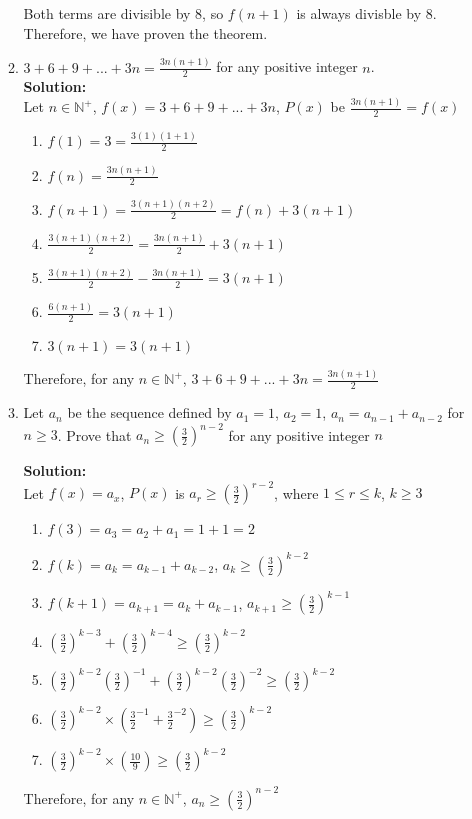\documentclass[12pt]{article}
\begin{document}
\begin{enumerate}
\begin{enumerate}
		Both terms are divisible by 8, so $f(n+1)$ is always divisble by 8. Therefore, we have proven the theorem.

		\newpage
		\item
		$3 + 6 + 9 +...+ 3n = \frac{3n(n+1)}{2}$ for any positive integer $n$.\\
		{\bf Solution:}\\

		Let $n \in \mathbb{N}^+$, $f(x) = 3 + 6 + 9 + ... + 3n$, $P(x)$ be $\frac{3n(n+1)}{2} = f(x)$
		\begin{enumerate}
			\item $f(1) = 3 = \frac{3(1)(1+1)}{2}$
			\item $f(n) = \frac{3n(n+1)}{2}$
			\item $f(n+1) = \frac{3(n+1)(n+2)}{2} = f(n) + 3(n+1)$
			\item $\frac{3(n+1)(n+2)}{2} = \frac{3n(n+1)}{2} + 3(n+1)$
			\item $\frac{3(n+1)(n+2)}{2} - \frac{3n(n+1)}{2} = 3(n+1)$
			\item $\frac{6(n+1)}{2} = 3(n+1)$
			\item $3(n+1) = 3(n+1)$
		\end{enumerate}

		Therefore, for any $n \in \mathbb{N}^+$, $3 + 6 + 9 +...+ 3n = \frac{3n(n+1)}{2}$

		\newpage
		\item
		Let $a_n$ be the sequence defined by $a_1 = 1$, $a_2 = 1$, $a_n = a_{n-1} + a_{n-2}$ for $n \geq 3$. Prove that $a_n \geq (\frac{3}{2})^{n-2}$ 	for any positive integer $n$

		{\bf Solution:}\\
		Let $f(x) = a_x$, $P(x)$ is $a_r \geq (\frac{3}{2})^{r-2}$, where $1 \leq r \leq k$, $k \geq 3$
		\begin{enumerate}
			\item $f(3) = a_3 = a_2 + a_1 = 1 + 1 = 2$
			\item $f(k) = a_k = a_{k-1} + a_{k-2}$, $a_k \geq (\frac{3}{2})^{k-2}$
			\item $f(k+1) = a_{k+1} = a_k + a_{k-1}$, $a_{k+1} \geq (\frac{3}{2})^{k-1}$
			\item $(\frac{3}{2})^{k-3} + (\frac{3}{2})^{k-4} \geq (\frac{3}{2})^{k-2}$
			\item $(\frac{3}{2})^{k-2}(\frac{3}{2})^{-1} + (\frac{3}{2})^{k-2}(\frac{3}{2})^{-2} \geq (\frac{3}{2})^{k-2}$
			\item $(\frac{3}{2})^{k-2} \times (\frac{3}{2}^{-1}+\frac{3}{2}^{-2}) \geq (\frac{3}{2})^{k-2}$
			\item $(\frac{3}{2})^{k-2} \times (\frac{10}{9}) \geq (\frac{3}{2})^{k-2}$
		\end{enumerate}

		Therefore, for any $n \in \mathbb{N}^+$, $a_n \geq (\frac{3}{2})^{n-2}$

		\newpage
	\end{enumerate}


\end{enumerate}
\end{document}
